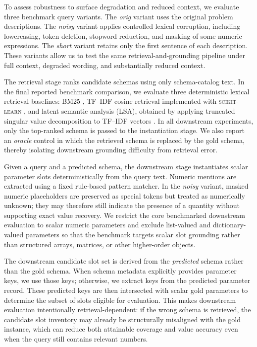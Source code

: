 \documentclass[pdflatex,sn-basic,Numbered]{sn-jnl}
\begin{document}
To assess robustness to surface degradation and reduced context, we evaluate three benchmark query variants. The \emph{orig} variant uses the original problem descriptions. The \emph{noisy} variant applies controlled lexical corruption, including lowercasing, token deletion, stopword reduction, and masking of some numeric expressions. The \emph{short} variant retains only the first sentence of each description. These variants allow us to test the same retrieval-and-grounding pipeline under full context, degraded wording, and substantially reduced context.

The retrieval stage ranks candidate schemas using only schema-catalog text. In the final reported benchmark comparison, we evaluate three deterministic lexical retrieval baselines: BM25 \cite{robertson2009bm25}, TF--IDF cosine retrieval implemented with \textsc{scikit-learn} \cite{pedregosa2011sklearn}, and latent semantic analysis (LSA), obtained by applying truncated singular value decomposition to TF--IDF vectors \cite{deerwester1990lsa}. In all downstream experiments, only the top-ranked schema is passed to the instantiation stage. We also report an \emph{oracle} control in which the retrieved schema is replaced by the gold schema, thereby isolating downstream grounding difficulty from retrieval error.

Given a query and a predicted schema, the downstream stage instantiates scalar parameter slots deterministically from the query text. Numeric mentions are extracted using a fixed rule-based pattern matcher. In the \emph{noisy} variant, masked numeric placeholders are preserved as special tokens but treated as numerically unknown; they may therefore still indicate the presence of a quantity without supporting exact value recovery. We restrict the core benchmarked downstream evaluation to scalar numeric parameters and exclude list-valued and dictionary-valued parameters so that the benchmark targets scalar slot grounding rather than structured arrays, matrices, or other higher-order objects.

The downstream candidate slot set is derived from the \emph{predicted} schema rather than the gold schema. When schema metadata explicitly provides parameter keys, we use those keys; otherwise, we extract keys from the predicted parameter record. These predicted keys are then intersected with scalar gold parameters to determine the subset of slots eligible for evaluation. This makes downstream evaluation intentionally retrieval-dependent: if the wrong schema is retrieved, the candidate slot inventory may already be structurally misaligned with the gold instance, which can reduce both attainable coverage and value accuracy even when the query still contains relevant numbers.
\end{document}
